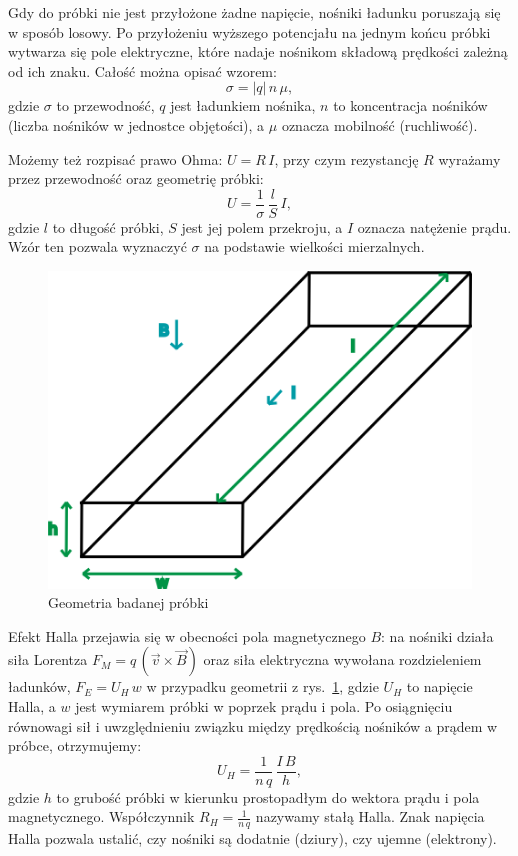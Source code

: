 \documentclass[12pt]{article}
\begin{document}
Gdy do próbki nie jest przyłożone żadne napięcie, nośniki ładunku poruszają się w sposób losowy. Po przyłożeniu wyższego potencjału na jednym końcu próbki wytwarza się pole elektryczne, które nadaje nośnikom składową prędkości zależną od ich znaku. Całość można opisać wzorem:
\begin{equation}
    \sigma = |q|\,n\,\mu,
    \label{eq:conductivity}
\end{equation}
gdzie $\sigma$ to przewodność, $q$ jest ładunkiem nośnika, $n$ to koncentracja nośników (liczba nośników w jednostce objętości), a $\mu$ oznacza mobilność (ruchliwość).

Możemy też rozpisać prawo Ohma: $U = R\,I$, przy czym rezystancję $R$ wyrażamy przez przewodność oraz geometrię próbki:
\begin{equation}
    U = \frac{1}{\sigma}\,\frac{l}{S}\, I,
    \label{eq:ohm_law}
\end{equation}
gdzie $l$ to długość próbki, $S$ jest jej polem przekroju, a $I$ oznacza natężenie prądu. Wzór ten pozwala wyznaczyć $\sigma$ na podstawie wielkości mierzalnych.

\begin{figure}[H]
    \centering
    \includegraphics[scale=1.3]{probka}
    \caption{Geometria badanej próbki}
    \label{fig:probka}
\end{figure}

Efekt Halla przejawia się w obecności pola magnetycznego $B$: na nośniki działa siła Lorentza $F_M = q\,(\vec{v} \times \vec{B})$ oraz siła elektryczna wywołana rozdzieleniem ładunków, $F_E = U_H\,w$ w przypadku geometrii z rys.~\ref{fig:probka}, gdzie $U_H$ to napięcie Halla, a $w$ jest wymiarem próbki w poprzek prądu i pola. Po osiągnięciu równowagi sił i uwzględnieniu związku między prędkością nośników a prądem w próbce, otrzymujemy:
\begin{equation}
    U_H = \frac{1}{n\,q}\,\frac{I\,B}{h},
    \label{eq:hall_voltage}
\end{equation}
gdzie $h$ to grubość próbki w kierunku prostopadłym do wektora prądu i pola magnetycznego. Współczynnik $R_H = \tfrac{1}{n\,q}$ nazywamy stałą Halla. Znak napięcia Halla pozwala ustalić, czy nośniki są dodatnie (dziury), czy ujemne (elektrony).
\end{document}
